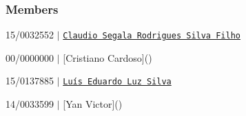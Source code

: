 \subsubsection*{Members}


\begin{DoxyItemize}
\item 15/0032552 $\vert$ \href{www.github.com/claudiosegala}{\tt Claudio Segala Rodrigues Silva Filho}
\item 00/0000000 $\vert$ \mbox{[}Cristiano Cardoso\mbox{]}()
\item 15/0137885 $\vert$ \href{https://github.com/lightguy875}{\tt Luís Eduardo Luz Silva}
\item 14/0033599 $\vert$ \mbox{[}Yan Victor\mbox{]}() 
\end{DoxyItemize}